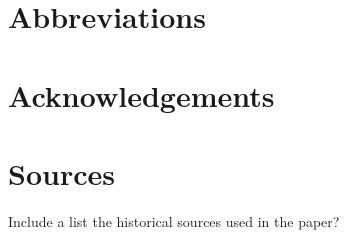 \documentclass[output=paper]{langsci/langscibook}
\begin{document}
\section*{Abbreviations}
\section*{Acknowledgements}


\section*{Sources}

Include a list the historical sources used in the paper?

{\sloppy
\printbibliography[heading=subbibliography,notkeyword=this]
}
\end{document}
